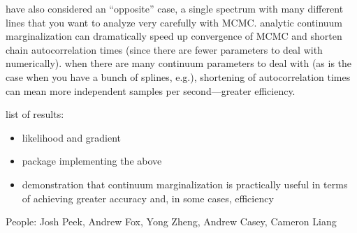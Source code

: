 \documentclass[manuscript]{aastex62}
\begin{document}
have also considered an ``opposite'' case, a single spectrum with many different lines that you want to analyze very carefully with MCMC.
analytic continuum marginalization can dramatically speed up convergence of MCMC and shorten chain autocorrelation times (since there are fewer parameters to deal with numerically).
when there are many continuum parameters to deal with (as is the case when you have a bunch of splines, e.g.), shortening of autocorrelation times can mean more independent samples per second---greater efficiency.

list of results:
\begin{itemize}
  \item likelihood and gradient
  \item package implementing the above
  \item demonstration that continuum marginalization is practically useful in terms of achieving greater accuracy and, in some cases, efficiency
\end{itemize}

\acknowledgments People: Josh Peek, Andrew Fox, Yong Zheng, Andrew Casey, Cameron Liang



\end{document}

